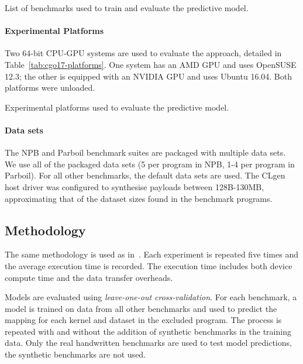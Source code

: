 \begin{table}%
  \centering%
  
  \caption[Benchmarks used in evaluation]{List of benchmarks used to train and evaluate the \citeauthor{Grewe2013} predictive model.} %
  \label{tab:cgo17-benchmarks} %
\end{table}

\paragraph*{Experimental Platforms}

Two 64-bit CPU-GPU systems are used to evaluate the approach, detailed in Table~\ref{tab:cgo17-platforms}. One system has an AMD GPU and uses OpenSUSE 12.3; the other is equipped with an NVIDIA GPU and uses Ubuntu 16.04. Both platforms were unloaded.

\begin{table}%
  \centering %
	
  \caption[Experimental platforms used in evaluation]{Experimental platforms used to evaluate the \citeauthor{Grewe2013} predictive model.}
  \label{tab:cgo17-platforms}
\end{table}

\paragraph*{Data sets}

The NPB and Parboil benchmark suites are packaged with multiple data sets. We use all of the packaged data sets (5 per program in NPB, 1-4 per program in Parboil). For all other benchmarks, the default data sets are used. The CLgen host driver was configured to synthesise payloads between 128B-130MB, approximating that of the dataset sizes found in the benchmark programs.


\subsection{Methodology}

The same methodology is used as in~\cite{Grewe2013}. Each experiment is repeated five times and the average execution time is recorded. The execution time includes both device compute time and the data transfer overheads.

Models are evaluated using \emph{leave-one-out cross-validation}. For each benchmark, a model is trained on data from all other benchmarks and used to predict the mapping for each kernel and dataset in the excluded program. The process is repeated with and without the addition of synthetic benchmarks in the training data. Only the real handwritten benchmarks are used to test model predictions, the synthetic benchmarks are not used.
